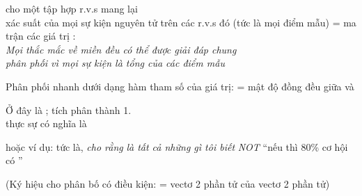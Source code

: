 \documentclass{article}
\begin{document}
\begin{huge}
 cho một tập hợp r.v.s mang lại \\
xác suất của mọi sự kiện nguyên tử trên các r.v.s đó (tức là mọi điểm mẫu)\al
   = ma trận các giá trị :\\
\emph{Mọi thắc mắc về miền đều có thể được giải đáp chung\\
phân phối vì mọi sự kiện là tổng của các điểm mẫu}


Phân phối nhanh dưới dạng hàm tham số của giá trị:\al
{} = mật độ đồng đều giữa  và 

\vspace*{0.2in}

\textwidth
{}

Ở đây  là ; tích phân thành 1.\\
 thực sự có nghĩa là
\mat{\[
  \lim_{dx \to 0} P(20.5 \leq X \leq 20.5+dx)/dx = 0.125
\]}



\vspace*{0.2in}

\textwidth
{}


 hoặc \al
  ví dụ: \al
  tức là, \emph{cho rằng}  \emph{là tất cả những gì tôi biết}\al
  \emph{NOT} ``nếu  thì 80\% cơ hội có ''

(Ký hiệu cho phân bố có điều kiện:\al
   = vectơ 2 phần tử của vectơ 2 phần tử)


\end{huge}
\end{document}
